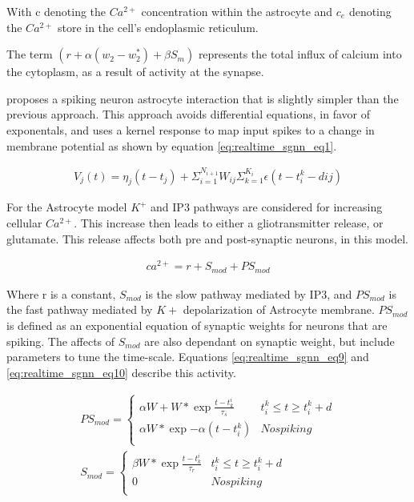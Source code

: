     With c denoting the $Ca^{2+}$ concentration within the astrocyte and $c_e$
    denoting the $Ca^{2+}$ store in the cell's endoplasmic reticulum.
    
    The term $(r + \alpha(w_2 - w^*_2) + \beta S_m)$ represents the total influx
    of calcium into the cytoplasm, as a result of activity at the synapse.
    
    \cite{realtime_sgnn} proposes a spiking neuron astrocyte interaction that is
    slightly simpler than the previous approach. This approach avoids
    differential equations, in favor of exponentals, and uses a kernel response
    to map input spikes to a change in membrane potential as shown by equation
    \ref{eq:realtime_sgnn_eq1}.
    
    \begin{align}
        V_j(t) = \eta_j(t - t_j) + \Sigma^{N_{i+1}}_{i=1}W_{ij}
        \Sigma^{K_i}_{k=1} \epsilon(t - t_i^k -
        d{ij}) \label{eq:realtime_sgnn_eq1}
    \end{align}
    
    For the Astrocyte model $K^+$ and IP3 pathways are considered for increasing
    cellular $Ca^{2+}$. This increase then leads to either a gliotransmitter
    release, or glutamate. This release affects both pre and post-synaptic
    neurons, in this model.
    
    \begin{align}
        ca^{2+} = r + S_{mod} + PS_{mod}
    \end{align}
    
    Where r is a constant, $S_{mod}$ is the slow pathway mediated by IP3, and
    $PS_{mod}$ is the fast pathway mediated by $K+$ depolarization of Astrocyte
    membrane. $PS_{mod}$ is defined as an exponential equation of synaptic
    weights for neurons that are spiking. The affects of $S_{mod}$ are also
    dependant on synaptic weight, but include parameters to tune the
    time-scale. Equations \ref{eq:realtime_sgnn_eq9} and
    \ref{eq:realtime_sgnn_eq10} describe this activity.
    
    \begin{align}
        PS_{mod} =
        \begin{cases} 
            \alpha W + W * \exp{\frac{t-t^i_k}{\tau_s}} & t_i^k \leq t \geq
            t_i^k + d \\ \alpha W * \exp{-\alpha(t - t_i^k)} & No spiking\\
        \end{cases} \label{eq:realtime_sgnn_eq9} \\
        S_{mod} =
        \begin{cases} 
            \beta W * \exp{\frac{t-t^i_k}{\tau_r}} & t_i^k \leq t \geq t_i^k + d
            \\ 0 & No spiking\\
        \end{cases} \label{eq:realtime_sgnn_eq10}
    \end{align}
    
